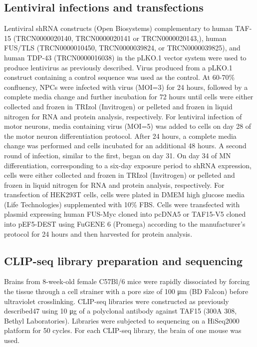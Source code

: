 \subsection{Lentiviral infections and transfections}
Lentiviral shRNA constructs (Open Biosystems) complementary to human TAF-15 (TRCN0000020140, TRCN0000020141 or TRCN0000020143,), human FUS/TLS (TRCN0000010450, TRCN0000039824, or TRCN0000039825), and human TDP-43 (TRCN0000016038) in the pLKO.1 vector system were used to produce lentivirus as previously described\cite{Yeo2009}. Virus produced from a pLKO.1 construct containing a control sequence was used as the control. At 60-70\% confluency, NPCs were infected with virus (MOI=3) for 24 hours, followed by a complete media change and further incubation for 72 hours until cells were either collected and frozen in TRIzol (Invitrogen) or pelleted and frozen in liquid nitrogen for RNA and protein analysis, respectively. For lentiviral infection of motor neurons, media containing virus (MOI=5) was added to cells on day 28 of the motor neuron differentiation protocol. After 24 hours, a complete media change was performed and cells incubated for an additional 48 hours. A second round of infection, similar to the first, began on day 31. On day 34 of MN differentiation, corresponding to a six-day exposure period to shRNA expression, cells were either collected and frozen in TRIzol (Invitrogen) or pelleted and frozen in liquid nitrogen for RNA and protein analysis, respectively. For transfection of HEK293T cells, cells were plated in DMEM high glucose media (Life Technologies) supplemented with 10\% FBS. Cells were transfected with plasmid expressing human FUS-Myc cloned into pcDNA5 or TAF15-V5 cloned into pEF5-DEST using FuGENE 6 (Promega) according to the manufacturer’s protocol for 24 hours and then harvested for protein analysis.

\subsection{CLIP-seq library preparation and sequencing}
Brains from 8-week-old female C57Bl/6 mice were rapidly dissociated by forcing the tissue through a cell strainer with a pore size of 100 μm (BD Falcon) before ultraviolet crosslinking. CLIP-seq libraries were constructed as previously described47 using 10 μg of a polyclonal antibody against TAF15 (300A 308, Bethyl Laboratories). Libraries were subjected to sequencing on a HiSeq2000 platform for 50 cycles. For each CLIP-seq library, the brain of one mouse was used.


